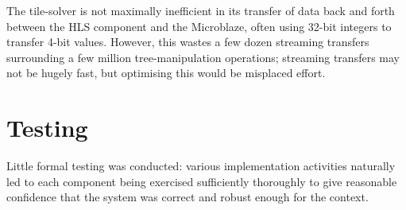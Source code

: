 \documentclass[a4paper,12pt]{article}
\begin{document}
The tile-solver is not maximally inefficient in its transfer of data
back and forth between the HLS component and the Microblaze, often
using 32-bit integers to transfer 4-bit values. However, this wastes a
few dozen streaming transfers surrounding a few million
tree-manipulation operations; streaming transfers may not be hugely
fast, but optimising this would be misplaced effort.

\section{Testing}

Little formal testing was conducted: various implementation activities
naturally led to each component being exercised sufficiently
thoroughly to give reasonable confidence that the system was correct
and robust enough for the context.
\end{document}

